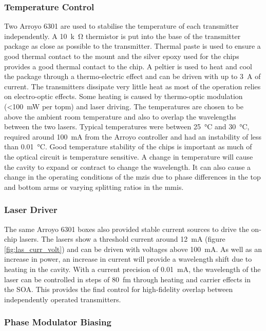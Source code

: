 \subsubsection{Temperature Control}

Two Arroyo 6301 are used to stabilise the temperature of each transmitter independently. A \SI{10}{k\ohm} thermistor is put into the base of the transmitter package as close as possible to the transmitter. Thermal paste is used to ensure a good thermal contact to the mount and the silver epoxy used for the chips provides a good thermal contact to the chip. A peltier is used to heat and cool the package through a thermo-electric effect and can be driven with up to \SI{3}{A} of current. The transmitters dissipate very little heat as most of the operation relies on electro-optic effects. Some heating is caused by thermo-optic modulation (\SI{<100}{mW} per \ac{topm}) and laser driving. The temperatures are chosen to be above the ambient room temperature and also to overlap the wavelengths between the two lasers. Typical temperatures were between \SI{25}{\celsius} and \SI{30}{\celsius}, required around \SI{100}{mA} from the Arroyo controller and had an instability of less than \SI{0.01}{\celsius}. Good temperature stability of the chips is important as much of the optical circuit is temperature sensitive. A change in temperature will cause the cavity to expand or contract to change the wavelength. It can also cause a change in the operating conditions of the \acp{mzi} due to phase differences in the top and bottom arms or varying splitting ratios in the \acp{mmi}.

\subsubsection{Laser Driver}

The same Arroyo 6301 boxes also provided stable current sources to drive the on-chip lasers. The lasers show a threshold current around \SI{12}{mA} (figure \ref{fig:las_curr_volt}) and can be driven with voltages above \SI{100}{mA}. As well as an increase in power, an increase in current will provide a wavelength shift due to heating in the cavity. With a current precision of \SI{0.01}{mA}, the wavelength of the laser can be controlled in steps of \SI{80}{fm} through heating and carrier effects in the \ac{SOA}. This provides the find control for high-fidelity overlap between independently operated transmitters. 

\subsubsection{Phase Modulator Biasing}

